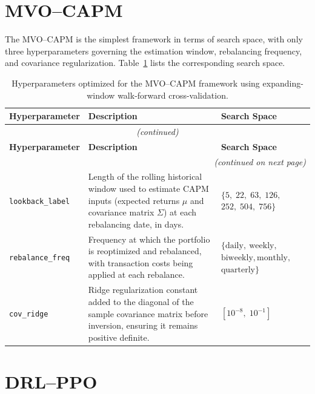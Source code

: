 \section{MVO--CAPM}

The MVO--CAPM is the simplest framework in terms of search space, with only three hyperparameters governing the estimation window, rebalancing frequency, and covariance regularization. Table~\ref{tab:hp_mvo_capm} lists the corresponding search space.

\begin{longtable}{@{}p{3.7cm} p{7.5cm} p{3.3cm}@{}}
\caption{Hyperparameters optimized for the MVO--CAPM framework using expanding-window walk-forward cross-validation.}
\label{tab:hp_mvo_capm} \\
\toprule
\textbf{Hyperparameter} & \textbf{Description} & \textbf{Search Space} \\
\midrule
\endfirsthead

\multicolumn{3}{c}{\footnotesize\textit{(continued)}} \\
\toprule
\textbf{Hyperparameter} & \textbf{Description} & \textbf{Search Space} \\
\midrule
\endhead

\bottomrule
\multicolumn{3}{r}{\footnotesize\textit{(continued on next page)}} \\
\endfoot

\bottomrule
\endlastfoot
 
\texttt{lookback\_label} & Length of the rolling historical window used to estimate CAPM inputs (expected returns $\mu$ and covariance matrix $\Sigma$) at each rebalancing date, in days. & $\{5,\;22,\;63,\;126,\;$ $252,\;504,\;756\}$ \\[6pt]
 
\texttt{rebalance\_freq} & Frequency at which the portfolio is reoptimized and rebalanced, with transaction costs being applied at each rebalance. & $\{\text{daily},\ \text{weekly},$ $\text{biweekly},\text{monthly},$ $\text{quarterly}\}$ \\[6pt]
 
\texttt{cov\_ridge} & Ridge regularization constant added to the diagonal of the sample covariance matrix before inversion, ensuring it remains positive definite. & $[10^{-8},\;10^{-1}]$ \\
 
\bottomrule
\end{longtable}


\section{DRL--PPO}

